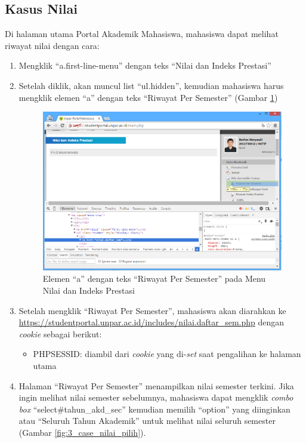 \subsection{Kasus Nilai}
Di halaman utama Portal Akademik Mahasiswa, mahasiswa dapat melihat riwayat nilai dengan cara:
\begin{enumerate}
	\item Mengklik ``a.first-line-menu'' dengan teks ``Nilai dan Indeks Prestasi'' 
	\item Setelah diklik, akan muncul list ``ul.hidden'', kemudian mahasiswa harus mengklik elemen ``a'' dengan teks ``Riwayat Per Semester'' (Gambar \ref{fig:3_case_nilai_menu})
	\begin{figure}[H]
			\centering
			\includegraphics[scale=0.5]{Gambar/case-nilai-menu}
			\caption{Elemen ``a'' dengan teks ``Riwayat Per Semester'' pada Menu Nilai dan Indeks Prestasi} 
			\label{fig:3_case_nilai_menu}
		\end{figure}
		\item Setelah mengklik ``Riwayat Per Semester'', mahasiswa akan diarahkan ke \url{https://studentportal.unpar.ac.id/includes/nilai.daftar_sem.php} dengan \textit{cookie} sebagai berikut:
\begin{itemize}
	\item PHPSESSID: diambil dari \textit{cookie} yang di-\textit{set} saat pengalihan ke halaman utama
\end{itemize}
		\item Halaman ``Riwayat Per Semester'' menampilkan nilai semester terkini. Jika ingin melihat nilai semester sebelumnya, mahasiswa dapat mengklik \textit{combo box} ``select\#tahun\_akd\_sec'' kemudian memilih ``option'' yang diinginkan atau ``Seluruh Tahun Akademik'' untuk melihat nilai seluruh semester (Gambar \ref{fig:3_case_nilai_pilih}).
		

\end{enumerate}
